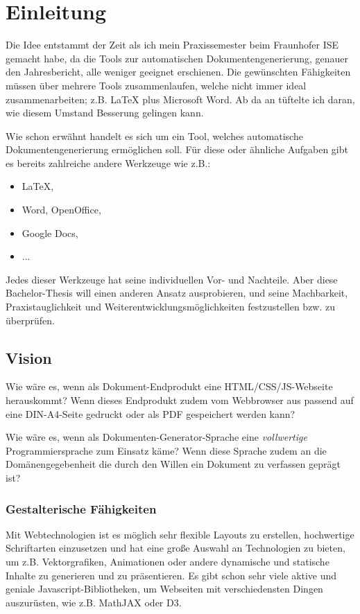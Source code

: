 \chapter{Einleitung}

Die Idee entstammt der Zeit als ich mein Praxissemester beim Fraunhofer ISE
gemacht habe, da die Tools zur automatischen Dokumentengenerierung, genauer
den Jahresbericht, alle weniger geeignet erschienen. Die gewünschten
Fähigkeiten müssen über mehrere Tools zusammenlaufen, welche nicht immer
ideal zusammenarbeiten; z.B. LaTeX plus Microsoft Word. Ab da an tüftelte
ich daran, wie diesem Umstand Besserung gelingen kann.

Wie schon erwähnt handelt es sich um ein Tool, welches automatische
Dokumentengenerierung ermöglichen soll. Für diese oder ähnliche Aufgaben
gibt es bereits zahlreiche andere Werkzeuge wie z.B.:

\begin{itemize}
  \item LaTeX,
  \item Word, OpenOffice,
  \item Google Docs,
  \item ...
\end{itemize}

Jedes dieser Werkzeuge hat seine individuellen Vor- und Nachteile.
Aber diese Bachelor-Thesis will einen anderen Ansatz ausprobieren, und
seine Machbarkeit, Praxistauglichkeit und Weiterentwicklungsmöglichkeiten
festzustellen bzw. zu überprüfen.

\section{Vision}

Wie wäre es, wenn als Dokument-Endprodukt eine HTML/CSS/JS-Webseite
herauskommt? Wenn dieses Endprodukt zudem vom Webbrowser aus passend auf
eine DIN-A4-Seite gedruckt oder als PDF gespeichert werden kann?

Wie wäre es, wenn als Dokumenten-\-Generator-\-Sprache eine \emph{vollwertige}
Programmiersprache zum Einsatz käme? Wenn diese Sprache zudem an die
Domänen\-gege\-ben\-heit die durch den Willen ein Dokument zu verfassen geprägt ist?

\subsection{Gestalterische Fähigkeiten}

Mit Webtechnologien ist es möglich sehr flexible Layouts zu erstellen,
hochwertige Schriftarten einzusetzen und hat eine große Auswahl an
Technologien zu bieten, um z.B. Vektorgrafiken, Animationen oder
andere dynamische und statische Inhalte zu generieren und zu
präsentieren. Es gibt schon sehr viele aktive und geniale Javascript-Bibliotheken,
um Webseiten mit verschiedensten Dingen auszurüsten, wie z.B. MathJAX oder D3.

